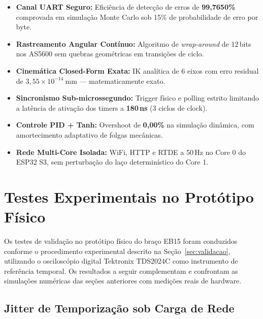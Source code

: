 \begin{itemize}
    \item \textbf{Canal UART Seguro:} Eficiência de detecção de erros de \textbf{99,7650\%} comprovada em simulação Monte Carlo sob 15\% de probabilidade de erro por byte.
    \item \textbf{Rastreamento Angular Contínuo:} Algoritmo de \textit{wrap-around} de 12\,bits nos AS5600 sem quebras geométricas em transições de ciclo.
    \item \textbf{Cinemática Closed-Form Exata:} IK analítica de 6 eixos com erro residual de $3{,}55 \times 10^{-14}\ \text{mm}$ --- matematicamente exato.
    \item \textbf{Sincronismo Sub-microssegundo:} Trigger físico e polling estrito limitando a latência de ativação dos timers a \textbf{180\,ns} (3 ciclos de clock).
    \item \textbf{Controle PID + Tanh:} Overshoot de \textbf{0,00\%} na simulação dinâmica, com amortecimento adaptativo de folgas mecânicas.
    \item \textbf{Rede Multi-Core Isolada:} WiFi, HTTP e RTDE a 50\,Hz no Core 0 do ESP32 S3, sem perturbação do laço determinístico do Core 1.
\end{itemize}

\section{Testes Experimentais no Protótipo Físico}
\label{sec:dev_testes_fisicos}

Os testes de validação no protótipo físico do braço EB15 foram conduzidos conforme o procedimento experimental descrito na Seção~\ref{sec:validacao}, utilizando o osciloscópio digital Tektronix TDS2024C como instrumento de referência temporal. Os resultados a seguir complementam e confrontam as simulações numéricas das seções anteriores com medições reais de hardware.


\subsection{Jitter de Temporização sob Carga de Rede}
\label{subsec:testes_jitter}

